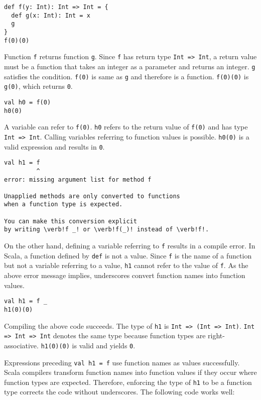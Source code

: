 \begin{verbatim}
def f(y: Int): Int => Int = {
  def g(x: Int): Int = x
  g
}
f(0)(0)
\end{verbatim}

Function \verb!f! returns function \verb!g!. Since \verb!f! has return type
\verb!Int => Int!, a return value must be a function that takes an integer as a
parameter and returns an integer. \verb!g! satisfies the condition. \verb!f(0)!
is same as \verb!g! and therefore is a function. \verb!f(0)(0)! is \verb!g(0)!,
which returns \verb!0!.


\begin{verbatim}
val h0 = f(0)
h0(0)
\end{verbatim}

A variable can refer to \verb!f(0)!. \verb!h0! refers to the return value of
\verb!f(0)! and has type \verb!Int => Int!. Calling variables referring to
function values is possible. \verb!h0(0)! is a valid expression and results in
\verb!0!.

\begin{verbatim}
val h1 = f
         ^
error: missing argument list for method f

Unapplied methods are only converted to functions
when a function type is expected.

You can make this conversion explicit
by writing \verb!f _! or \verb!f(_)! instead of \verb!f!.
\end{verbatim}

On the other hand, defining a variable referring to \verb!f! results in a compile
error. In Scala, a function defined by \verb!def! is not a value. Since \verb!f!
is the name of a function but not a variable referring to a value, \verb!h1!
cannot refer to the value of \verb!f!. As the above error message implies,
underscores convert function names into function values.

\begin{verbatim}
val h1 = f _
h1(0)(0)
\end{verbatim}

Compiling the above code succeeds. The type of \verb!h1! is \verb!Int => (Int => Int)!.
\verb!Int => Int => Int! denotes the same type because function types are
right-associative. \verb!h1(0)(0)! is valid and yields \verb!0!.

Expressions preceding \verb!val h1 = f! use function names as values
successfully. Scala compilers transform function names into function values if
they occur where function types are expected. Therefore, enforcing the type of
\verb!h1! to be a function type corrects the code without underscores. The
following code works well:

